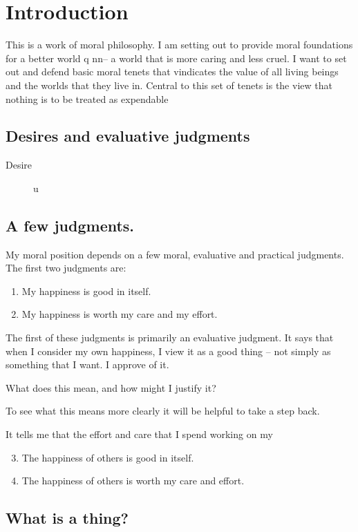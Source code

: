 
\chapter{Introduction}\label{ch:int}
This is a work of moral philosophy.
I am setting out to provide moral foundations for a better world q nn-- a world that
is more caring and less cruel.
I want to set out and defend basic moral tenets that vindicates the value of all
living beings and the worlds that they live in.
Central to this set of tenets is the view that nothing is to be treated as
expendable

\section{Desires and evaluative judgments}\label{sec:org490780f}
\begin{description}
\item[{Desire}] u
\end{description}
\section{A few judgments.}\label{sec:judgments}
My moral position depends on a few moral, evaluative and practical
judgments.
The first two judgments are:
\begin{enumerate}
\item My happiness is good in itself.
\item My happiness is worth my care and my effort.
\end{enumerate}
The first of these judgments is primarily an evaluative judgment.
It says that when I consider my own happiness, I view it as a good thing --
not simply as something that I want.
I approve of it.

What does this mean, and how might I justify it?

To see what this means more clearly it will be helpful to take a step back.


It tells me that the effort and care that I spend working on my

\begin{enumerate}
\setcounter{enumi}{2}
\item The happiness of others is good in itself.
\item The happiness of others is worth my care and effort.
\end{enumerate}


\section{What is a thing?}
\label{sec:whatisthing}
